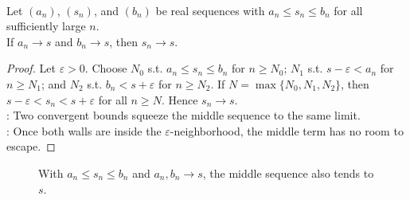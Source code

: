 \begin{theorem} \label{thm:pinching-theorem-sequences} \\
Let $(a_n)$, $(s_n)$, and $(b_n)$ be real sequences with $a_n\leq s_n\leq b_n$ for all sufficiently large $n$.\\
If $a_n\to s$ and $b_n\to s$, then $s_n\to s$.
\begin{proof}
Let $\varepsilon>0$. Choose $N_0$ s.t. $a_n\leq s_n\leq b_n$ for $n\geq N_0$; $N_1$ s.t. $s-\varepsilon<a_n$ for $n\geq N_1$; and $N_2$ s.t. $b_n<s+\varepsilon$ for $n\geq N_2$. If $N=\max\{N_0,N_1,N_2\}$, then $s-\varepsilon<s_n<s+\varepsilon$ for all $n\geq N$. Hence $s_n\to s$.\\
: Two convergent bounds squeeze the middle sequence to the same limit.\\
: Once both walls are inside the $\varepsilon$-neighborhood, the middle term has no room to escape.
\end{proof}
\end{theorem}

\begin{figure}[H]
  \centering
  
  \caption{With $a_n\leq s_n\leq b_n$ and $a_n,b_n\to s$, the middle sequence also tends to $s$.}
  \label{fig:pinching-theorem-sequences}
\end{figure}

